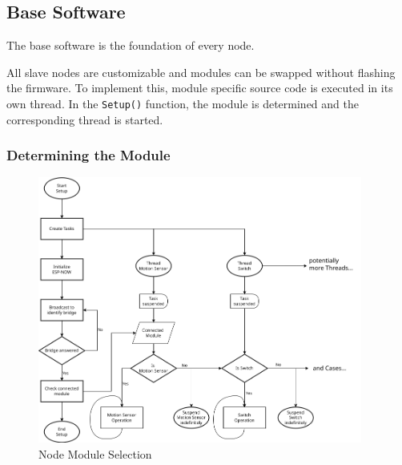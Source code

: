 \subsection{Base Software}
The base software is the foundation of every node. %

All slave nodes are customizable and modules can be swapped without flashing
the firmware. To implement this, module specific source code is executed in
its own thread. In the \texttt{Setup()} function, the module is determined
and the corresponding thread is started.

        \subsubsection{Determining the Module}

        \begin{figure}[H]
            \centering
            \includegraphics[width=0.95\textwidth]{./topics/flowcharts/Slave.drawio.png}
            \caption{Node Module Selection}
            \label{fig:NodeModuleSelection}
        \end{figure}

